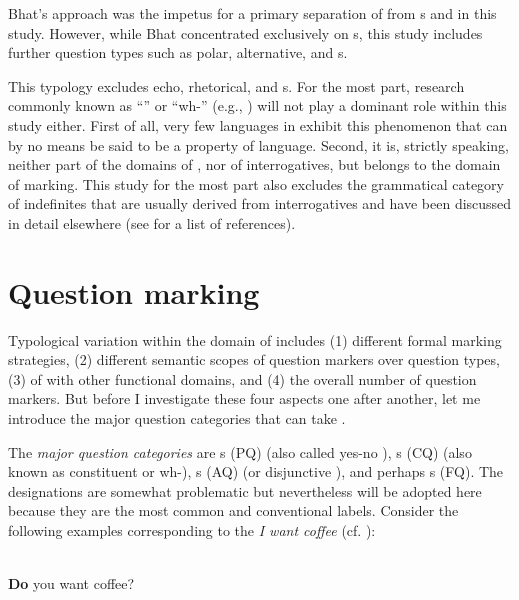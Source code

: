 \noindent Bhat’s approach was the impetus for a primary separation of  from s and  in this study. However, while Bhat concentrated exclusively on s, this study includes further question types such as polar, alternative, and s.

This typology excludes echo, rhetorical, and s. For the most part, research commonly known as “” or “wh-” (e.g., \citealt{Cable2007}) will not play a dominant role within this study either. First of all, very few languages in  exhibit this phenomenon that can by no means be said to be a  property of language. Second, it is, strictly speaking, neither part of the domains of , nor of interrogatives, but belongs to the domain of  marking. This study for the most part also excludes the grammatical category of indefinites that are usually derived from interrogatives and have been discussed in detail elsewhere (see \citealt{VanAlsenoyvanderAuwera2015} for a list of references).

\section{Question marking}\label{sec:4.2}

Typological variation within the domain of  includes (1) different formal marking strategies, (2) different semantic scopes of question markers over question types, (3)  of  with other functional domains, and (4) the overall number of question markers. But before I investigate these four aspects one after another, let me introduce the major question categories that can take .

The \textit{major question categories} are s (PQ) (also called yes-no ), s (CQ) (also known as constituent or wh-), s (AQ) (or disjunctive ), and perhaps s (FQ). The designations are somewhat problematic but nevertheless will be adopted here because they are the most common and conventional labels. Consider the following examples corresponding to the  \textit{I want coffee} (cf. \citealt[18]{Hölzl2016a}):

\newpage 
\ea%
    \label{ex:4:1}
    \\
    \ea
      \textbf{{Do}} you want coffee?\\

